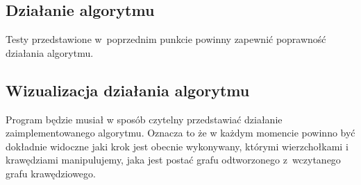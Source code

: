 \documentclass{article}
\begin{document}
\subsection{Działanie algorytmu}

Testy przedstawione w~poprzednim punkcie powinny zapewnić poprawność działania algorytmu.

\subsection{Wizualizacja działania algorytmu}

Program będzie musiał w sposób czytelny przedstawiać działanie zaimplementowanego algorytmu. Oznacza to że w każdym momencie powinno być dokładnie widoczne jaki krok jest obecnie wykonywany, którymi wierzchołkami i krawędziami manipulujemy, jaka jest postać grafu odtworzonego z~wczytanego grafu krawędziowego.
 

\end{document}
